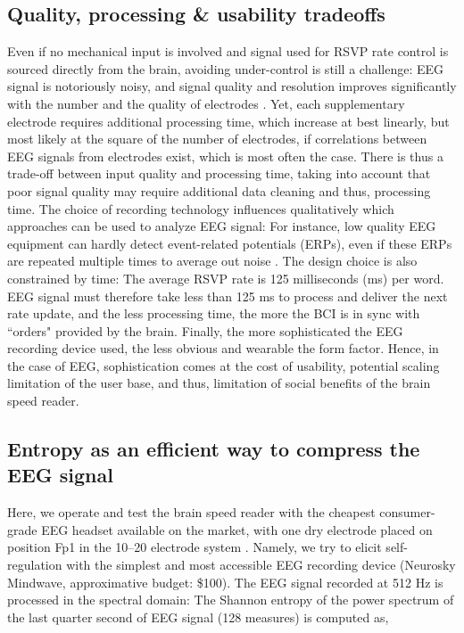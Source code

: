 \subsection{Quality, processing \& usability tradeoffs}
Even if no mechanical input is involved and signal used for RSVP rate control is sourced directly from the brain, avoiding under-control is still a challenge: EEG signal is notoriously noisy, and signal quality and resolution improves significantly with the number and the quality of electrodes \cite{michel2004eeg}. Yet, each supplementary electrode requires additional processing time, which increase at best linearly, but most likely at the square of the number of electrodes, if correlations between EEG signals from electrodes exist, which is most often the case. There is thus a trade-off between input quality and processing time, taking into account that poor signal quality may require additional data cleaning and thus, processing time. The choice of recording technology influences qualitatively which approaches can be used to analyze EEG signal: For instance, low quality EEG equipment can hardly detect event-related potentials (ERPs), even if these ERPs are repeated multiple times to average out noise \cite{ERP_consumergrade_EEG}. The design choice is also constrained by time: The average RSVP rate is 125 milliseconds (ms) per word. EEG signal must therefore take less than 125 ms to process and deliver the next rate update, and the less processing time, the more the BCI is in sync with ``orders" provided by the brain. Finally, the more sophisticated the EEG recording device used, the less obvious and wearable the form factor. Hence, in the case of EEG, sophistication comes at the cost of usability, potential scaling limitation of the user base, and thus, limitation of social benefits of the brain speed reader.

\subsection{Entropy as an efficient way to compress the EEG signal}
Here, we operate and test the brain speed reader with the cheapest consumer-grade EEG headset available on the market, with one dry electrode placed on position {Fp1} in the 10--20 electrode system \cite{klem1999ten}. Namely, we try to elicit self-regulation with the simplest and most accessible EEG recording device (Neurosky Mindwave, approximative budget: \$100). The EEG signal recorded at 512 Hz is processed in the spectral domain: The Shannon entropy of the power spectrum of the last quarter second of EEG signal (128 measures) is computed as, 

